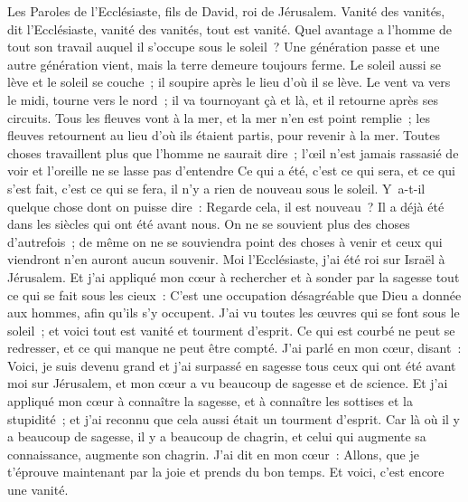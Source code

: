\begin{multicols}{2}
\VerseOne{}Les Paroles de l'Ecclésiaste, fils de David, roi de Jérusalem.
Vanité des vanités, dit l'Ecclésiaste, vanité des vanités, tout est vanité.
Quel avantage a l'homme de tout son travail auquel il s'occupe sous le soleil~?
Une génération passe et une autre génération vient, mais la terre demeure toujours ferme.
Le soleil aussi se lève et le soleil se couche~; il soupire après le lieu d'où il se lève.
Le vent va vers le midi, tourne vers le nord~; il va tournoyant çà et là, et il retourne après ses circuits.
Tous les fleuves vont à la mer, et la mer n'en est point remplie~; les fleuves retournent au lieu d'où ils étaient partis, pour revenir à la mer. 
Toutes choses travaillent plus que l'homme ne saurait dire~; l'œil n'est jamais rassasié de voir et l'oreille ne se lasse pas d'entendre 
Ce qui a été, c'est ce qui sera, et ce qui s'est fait, c'est ce qui se fera, il n'y a rien de nouveau sous le soleil.
Y~a-t-il quelque chose dont on puisse dire~: Regarde cela, il est nouveau~? Il a déjà été dans les siècles qui ont été avant nous.
On ne se souvient plus des choses d'autrefois~; de même on ne se souviendra point des choses à venir et ceux qui viendront n'en auront aucun souvenir. 
Moi l'Ecclésiaste, j'ai été roi sur Israël à Jérusalem.
Et j'ai appliqué mon cœur à rechercher et à sonder par la sagesse tout ce qui se fait sous les cieux~: C'est une occupation désagréable que Dieu a donnée aux hommes, afin qu'ils s'y occupent.
J'ai vu toutes les œuvres qui se font sous le soleil~; et voici tout est vanité et tourment d'esprit.
Ce qui est courbé ne peut se redresser, et ce qui manque ne peut être compté.
J'ai parlé en mon cœur, disant~: Voici, je suis devenu grand et j'ai surpassé en sagesse tous ceux qui ont été avant moi sur Jérusalem, et mon cœur a vu beaucoup de sagesse et de science.
Et j'ai appliqué mon cœur à connaître la sagesse, et à connaître les sottises et la stupidité~; et j'ai reconnu que cela aussi était un tourment d'esprit.
Car là où il y a beaucoup de sagesse, il y a beaucoup de chagrin, et celui qui augmente sa connaissance, augmente son chagrin.
\VerseOne{}J'ai dit en mon cœur~: Allons, que je t'éprouve maintenant par la joie et prends du bon temps. Et voici, c'est encore une vanité.

\end{multicols}
